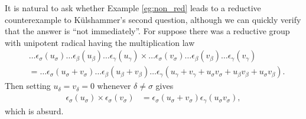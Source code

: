 It is natural to ask whether Example \ref{eg:non_red} leads to a reductive counterexample to K\"ulshammer's second question, although we can quickly verify that the answer is ``not immediately''. For suppose there was a reductive group with unipotent radical having the multiplication law
\begin{align*}
	&\ldots \epsilon_\sigma(u_\sigma) \ldots \epsilon_\beta(u_\beta) \ldots \epsilon_\gamma(u_\gamma) \times
	\ldots \epsilon_\sigma(v_\sigma) \ldots \epsilon_\beta(v_\beta) \ldots \epsilon_\gamma(v_\gamma)\\
	&=
	\ldots \epsilon_\sigma(u_\sigma + v_\sigma) \ldots \epsilon_\beta(u_\beta + v_\beta) \ldots \epsilon_\gamma(u_\gamma + v_\gamma + u_\sigma v_\sigma + u_\beta v_\beta + u_\sigma v_\beta).
\end{align*}
Then setting $u_\delta = v_\delta = 0$ whenever $\delta \neq \sigma$ gives
\begin{align*}
	\epsilon_\sigma(u_\sigma) \times \epsilon_\sigma(v_\sigma) &= \epsilon_\sigma(u_\sigma + v_\sigma) \epsilon_\gamma(u_\sigma v_\sigma),
\end{align*}
which is absurd.


